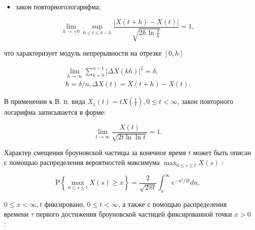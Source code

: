 \documentclass[10pt]{article}
\begin{document}
\begin{itemize}

  \item закон повторногологарифма;

\end{itemize}



\[

\lim _{h \rightarrow+0} \sup _{0 \leqslant t \leqslant \delta-h} \frac{|X(t+h)-X(t)|}{\sqrt{2 h \ln \frac{\delta}{h}}}=1,

\]



что характеризует модуль непрерывности на отрезке $[0, h]$



\[

\begin{gathered}

\lim _{h \rightarrow \infty} \sum_{k=0}^{n-1}|\Delta X(k h)|^{2}=\delta, \\

h=\delta / n, \Delta X(t)=X(t+h)-X(t) .

\end{gathered}

\]



В применении к В. п. вида $X_{1}(t)=t X\left(\frac{1}{t}\right), 0 \leqslant t<\infty$, закон повторного логарифма записывается в форме:



\[

\lim _{t \rightarrow \infty} \frac{X(t)}{\sqrt{2 t \ln \ln t}}=1 .

\]



Характер смещения броуновской частицы за конечное время $t$ может быть описан с помощью распределения вероятностей максимума $\max _{0 \leqslant s \leqslant t} X(s)$ :



\[

\mathrm{P}\left\{\max _{0 \leqslant s \leqslant t} X(s) \geqslant x\right\}=\frac{2}{\sqrt{2 \pi t}} \int_{x}^{\infty} e^{-u^{2} / 2 t} d u,

\]



$0 \leqslant x<\infty, t$ фиксировано, $0 \leqslant t<\infty$, а также с помощью распределения времени $\tau$ первого достижения броуновской частицей фиксированной точки $x>0$ :
\end{document}
